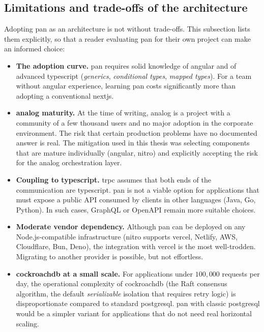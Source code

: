 \subsection{Limitations and trade-offs of the architecture}\label{subsec:pan-limitari}

Adopting \gls{pan} as an architecture is not without trade-offs.
This subsection lists them explicitly, so that a reader evaluating \gls{pan} for their own project can make an informed choice:

\begin{itemize}
  \item \textbf{The adoption curve.} \gls{pan} requires solid knowledge of \gls{angular} and of advanced \gls{typescript} (\textit{generics}, \textit{conditional types}, \textit{mapped types}). For a team without \gls{angular} experience, learning \gls{pan} costs significantly more than adopting a conventional \gls{nextjs}.

  \item \textbf{\gls{analog} maturity.} At the time of writing, \gls{analog} is a project with a community of a few thousand users and no major adoption in the corporate environment. The risk that certain production problems have no documented answer is real. The mitigation used in this thesis was selecting components that are mature individually (\gls{angular}, \gls{nitro}) and explicitly accepting the risk for the \gls{analog} orchestration layer.

  \item \textbf{Coupling to \gls{typescript}.} \gls{trpc} assumes that both ends of the communication are \gls{typescript}. \gls{pan} is not a viable option for applications that must expose a public API consumed by clients in other languages (Java, Go, Python). In such cases, GraphQL or OpenAPI remain more suitable choices.

  \item \textbf{Moderate vendor dependency.} Although \gls{pan} can be deployed on any Node.js-compatible infrastructure (\gls{nitro} supports \gls{vercel}, Netlify, AWS, Cloudflare, Bun, Deno), the integration with \gls{vercel} is the most well-trodden. Migrating to another provider is possible, but not effortless.

  \item \textbf{\gls{cockroachdb} at a small scale.} For applications under \(100{,}000\) requests per day, the operational complexity of \gls{cockroachdb} (the Raft consensus algorithm, the default \textit{serializable} isolation that requires retry logic) is disproportionate compared to standard \gls{postgresql}. \gls{pan} with classic \gls{postgresql} would be a simpler variant for applications that do not need real horizontal scaling.


\end{itemize}
